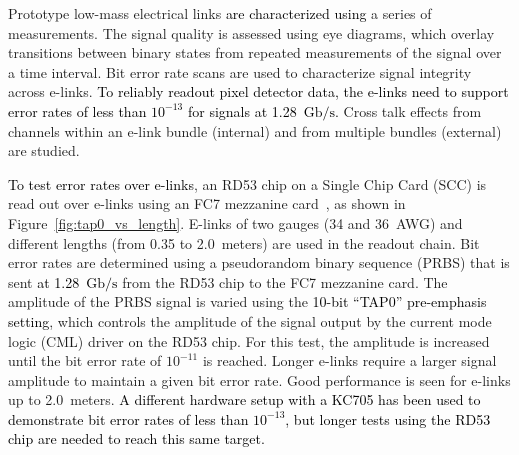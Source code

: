 \documentclass[a4paper,11pt]{article}
\newcommand{\fig}{Figure}
\newcommand{\gbps}{\ensuremath{\mathrm{Gb}/\mathrm{s}}\xspace}
\newcommand{\black}{\textcolor{black}}
\begin{document}

Prototype low-mass electrical links \black{are characterized using} a series of measurements.
The signal quality is assessed using eye diagrams, which overlay transitions between binary states from repeated measurements of the signal over a time interval.
Bit error rate scans are used to characterize signal integrity across e-links.
\black{To reliably readout pixel detector data, the e-links need to support error rates of less than $10^{-13}$ for signals at 1.28~\gbps.}
Cross talk effects from channels within an e-link bundle (internal) and from multiple bundles (external) are studied.


\black{To test error rates over e-links}, an RD53 chip on a Single Chip Card (SCC) is read out over e-links using an FC7 mezzanine card~\cite{ref:fc7}, as shown in \fig~\ref{fig:tap0_vs_length}.
E-links of two gauges (34 and 36~AWG) and different lengths (from 0.35 to 2.0~meters) are used in the readout chain.
Bit error rates are determined using a pseudorandom binary sequence (PRBS) that is sent \black{at 1.28~\gbps} from the RD53 chip to the FC7 mezzanine card.
The amplitude of the PRBS signal is varied using the \black{10-bit ``TAP0'' pre-emphasis setting}, which controls the amplitude of the signal output by the current mode logic (CML) driver on the RD53 chip.
For this test, the amplitude is increased until the bit error rate of $10^{-11}$ is reached.
Longer e-links require a larger signal amplitude to maintain a given bit error rate.
Good performance is seen for e-links up to 2.0~meters.
\black{A different hardware setup with a KC705 has been used to demonstrate bit error rates of less than $10^{-13}$, but longer tests using the RD53 chip are needed to reach this same target.}
\end{document}
